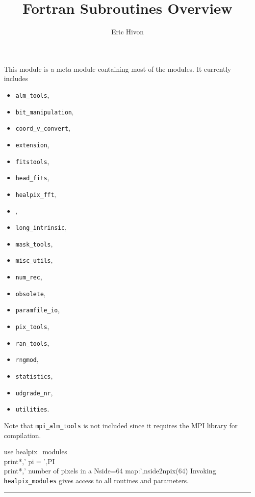 
\sloppy


\title{\healpix Fortran Subroutines Overview}
 \section[healpix\_modules module]{ }
\label{sub:healpix_modules}
\author{Eric Hivon}

\begin{facility}
{This module is a meta module containing most of the \healpix modules. It currently includes
\begin{itemize}
\setlength{\itemsep}{-5pt}
  \item {\tt{alm\_tools}},
  \item {\tt{bit\_manipulation}},
  \item {\tt{coord\_v\_convert}},
  \item {\tt{extension}},
  \item {\tt{fitstools}},
  \item {\tt{head\_fits}},
  \item {\tt{healpix\_fft}},
  \item {},
  \item {\tt{long\_intrinsic}},
  \item {\tt{mask\_tools}},
  \item {\tt{misc\_utils}},
  \item {\tt{num\_rec}},
  \item {\tt{obsolete}},
  \item {\tt{paramfile\_io}},
  \item {\tt{pix\_tools}},
  \item {\tt{ran\_tools}},
  \item {\tt{rngmod}},
  \item {\tt{statistics}},
  \item {\tt{udgrade\_nr}},
  \item {\tt{utilities}}.
\end{itemize}

Note that {\tt{mpi\_alm\_tools}} is not included since it requires the MPI library for compilation.
}
{\modHealpixModules}
\end{facility}


\begin{example}
{
use healpix\_modules \\
print*,' pi = ',PI \\
print*,' number of pixels in a Nside=64 map:',nside2npix(64)
}
{
Invoking {\tt{healpix\_modules}} gives access to all \healpix routines and parameters.
}
\end{example}


\rule{\hsize}{2mm}

\newpage
